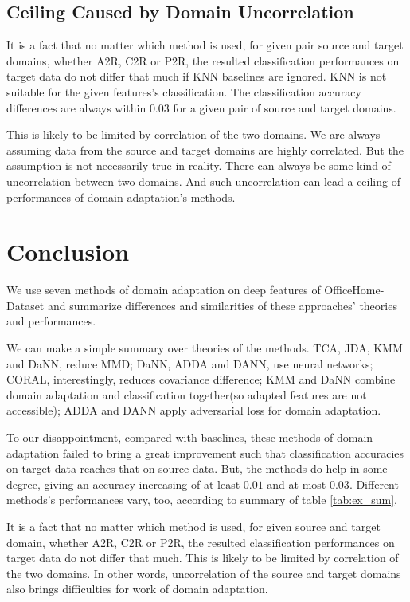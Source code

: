 \documentclass[conference]{IEEEtran}
\begin{document}
\subsection{Ceiling Caused by Domain Uncorrelation}
It is a fact that no matter which method is used, for given pair source and target domains, whether A2R, C2R or P2R, the resulted classification performances on target data do not differ that much if KNN baselines are ignored. KNN is not suitable for the given features's classification. The classification accuracy differences are always within $0.03$ for a given pair of source and target domains.

This is likely to be limited by correlation of the two domains. We are always assuming data from the source and target domains are highly correlated. But the assumption is not necessarily true in reality. There can always be some kind of uncorrelation between two domains. And such uncorrelation can lead a ceiling of performances of domain adaptation's methods.


\section{Conclusion}
We use seven methods of domain adaptation on deep features of OfficeHome-Dataset and summarize differences and similarities of these approaches' theories and performances.

We can make a simple summary over theories of the methods. TCA, JDA, KMM and DaNN, reduce MMD; DaNN, ADDA and DANN, use neural networks; CORAL, interestingly, reduces covariance difference; KMM and DaNN combine domain adaptation and classification together(so adapted features are not accessible); ADDA and DANN apply adversarial loss for domain adaptation.

To our disappointment, compared with baselines, these methods of domain adaptation failed to bring a great improvement such that classification accuracies on target data reaches that on source data. But, the methods do help in some degree, giving an accuracy increasing of at least $0.01$ and at most $0.03$. Different methods's performances vary, too, according to summary of table \ref{tab:ex_sum}.

It is a fact that no matter which method is used, for given source and target domain, whether A2R, C2R or P2R, the resulted classification performances on target data do not differ that much. This is likely to be limited by correlation of the two domains. In other words, uncorrelation of the source and target domains also brings difficulties for work of domain adaptation.
\end{document}
